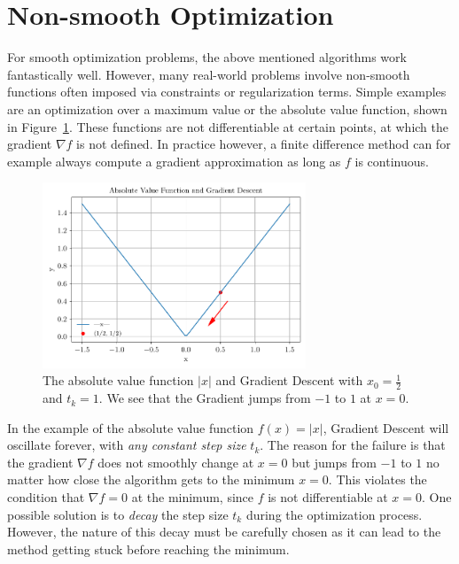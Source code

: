 \documentclass{article}
\begin{document}
\section{Non-smooth Optimization}

For smooth optimization problems, the above mentioned algorithms
work fantastically well.
However, many real-world problems involve non-smooth functions
often imposed via constraints or regularization terms.
Simple examples are an optimization over a maximum value
or the absolute value function, shown in
Figure~\ref{fig:abs_value_function}.
These functions are not differentiable at certain points,
at which the gradient $\nabla f$ is not defined.
In practice however, a finite difference method can for example always compute
a gradient approximation as long as $f$ is continuous.

\begin{figure}[htbp]
    \centering
    \includegraphics[width=0.7\textwidth]{plots/abs_val_func.pdf}
    \caption{The absolute value function $|x|$ and Gradient Descent with
        $x_0 = \frac{1}{2}$ and $t_k = 1$.
        We see that the Gradient jumps from $-1$ to $1$ at $x = 0$.
    }
    \label{fig:abs_value_function}
\end{figure}

In the example of the absolute value function $f(x) = |x|$,
Gradient Descent will oscillate forever,
with \emph{any constant step size} $t_k$.
The reason for the failure is that the gradient $\nabla f$
does not smoothly change at $x = 0$ but jumps from $-1$ to $1$
no matter how close the algorithm gets to the minimum $x = 0$.
This violates the condition that $\nabla f = 0$ at the minimum,
since $f$ is not differentiable
at $x = 0$.
One possible solution is to \emph{decay} the step size
$t_k$ during the optimization process.
However, the nature of this decay must be carefully chosen
as it can lead to the method getting stuck before
reaching the minimum.
\end{document}
